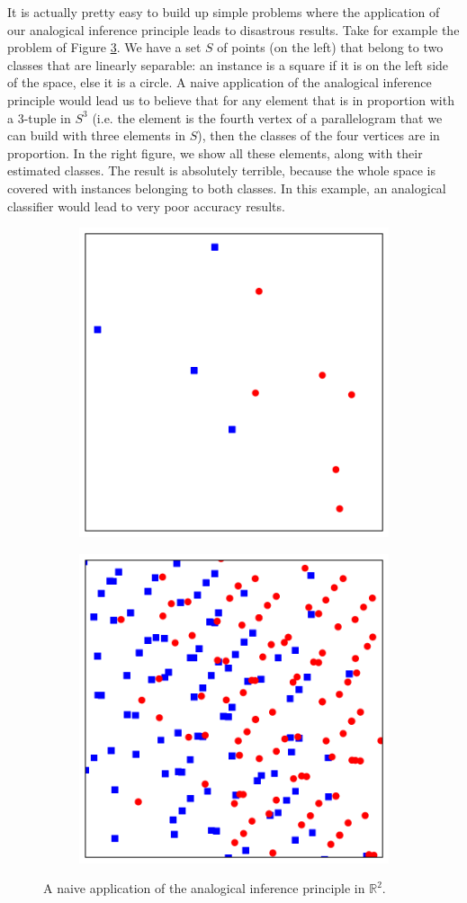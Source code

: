 It is actually pretty easy to build up simple problems where the application of
our analogical inference principle leads to disastrous results.  Take for
example the problem of Figure \ref{FIG:classif_in_R2}. We have a set $S$ of
points (on the left) that belong to two classes that are linearly separable: an
instance is a square if it is on the left side of the space, else it is a
circle. A naive application of the analogical inference principle would lead us
to believe that for any element that is in proportion with a $3$-tuple in $S^3$
(i.e. the element is the fourth vertex of a parallelogram that we can build
with three elements in $S$), then the classes of the four vertices are in
proportion. In the right figure, we show all these elements, along with their
estimated classes. The result is absolutely terrible, because the whole space
is covered with instances belonging to both classes. In this example,
an analogical classifier would lead to very poor accuracy results.

\begin{figure}
\centering
\begin{subfigure}{.5\textwidth}
  \centering
  \includegraphics[width=.6\linewidth]{figures/AE_in_R2_S.pdf}
  \label{fig:sub1}
\end{subfigure}%
\begin{subfigure}{.5\textwidth}
  \centering
  \includegraphics[width=.6\linewidth]{figures/AE_in_R2_AE.pdf}
  \label{fig:sub2}
\end{subfigure}
  \caption{A naive application of the analogical inference principle in
  $\mathbb{R}^2$.}
\label{FIG:classif_in_R2}
\end{figure}

